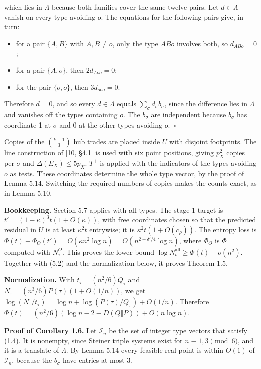 \documentclass[english,11pt,a4paper]{article}
\providecommand{\tightlist}{\setlength{\itemsep}{0pt}\setlength{\parskip}{0pt}}
\newcounter{none}
\begin{document}
which lies in \(\Lambda\) because both families cover the same twelve pairs. Let \(d\in\Lambda\) vanish on every type avoiding \(o\). The equations for the following pairs give, in turn:

\begin{itemize}
\tightlist
\item
  for a pair \(\{A,B\}\) with \(A,B\ne o\), only the type \(ABo\) involves both, so \(d_{ABo}=0\);
\item
  for a pair \(\{A,o\}\), then \(2d_{Aoo}=0\);
\item
  for the pair \(\{o,o\}\), then \(3d_{ooo}=0\).
\end{itemize}

Therefore \(d=0\), and so every \(d\in\Lambda\) equals \(\sum_\sigma d_\sigma b_\sigma\), since the difference lies in \(\Lambda\) and vanishes off the types containing \(o\). The \(b_\sigma\) are independent because \(b_\sigma\) has coordinate 1 at \(\sigma\) and 0 at the other types avoiding \(o\).~\(\square\)

Copies of the \(\binom{k+1}{3}\) hub trades are placed inside \(U\) with disjoint footprints. The line construction of {[}10, §4.1{]} is used with six point positions, giving \(p_X^2\) copies per \(\sigma\) and \(\Delta(E_X)\le5p_X\). \(T^+\) is applied with the indicators of the types avoiding \(o\) as tests. These coordinates determine the whole type vector, by the proof of Lemma 5.14. Switching the required numbers of copies makes the counts exact, as in Lemma 5.10.

\textbf{Bookkeeping.} Section 5.7 applies with all types. The stage-1 target is \(t'=(1-\kappa)^3t(1+O(\kappa))\), with free coordinates chosen so that the predicted residual in \(U\) is at least \(\kappa^2t\) entrywise; it is \(\kappa^2t(1+O(c_\rho))\). The entropy loss is \(\Phi(t)-\Phi_O(t')=O(\kappa n^2\log n)=O(n^{2-\delta'/4}\log n)\), where \(\Phi_O\) is \(\Phi\) computed with \(N^O_\tau\). This proves the lower bound \(\log N^{\mathrm{all}}_t\ge\Phi(t)-o(n^2)\). Together with (5.2) and the normalization below, it proves Theorem 1.5.

\textbf{Normalization.} With \(t_\tau=(n^2/6)Q_\tau\) and \(N_\tau=(n^3/6)P(\tau)(1+O(1/n))\), we get \(\log(N_\tau/t_\tau)=\log n+\log(P(\tau)/Q_\tau)+O(1/n)\). Therefore \(\Phi(t)=(n^2/6)(\log n-2-D(Q\Vert P))+O(n\log n)\).

\textbf{Proof of Corollary 1.6.} Let \(\mathcal I_n\) be the set of integer type vectors that satisfy (1.4). It is nonempty, since Steiner triple systems exist for \(n\equiv1,3\pmod 6\), and it is a translate of \(\Lambda\). By Lemma 5.14 every feasible real point is within \(O(1)\) of \(\mathcal I_n\), because the \(b_\sigma\) have entries at most 3.
\end{document}
